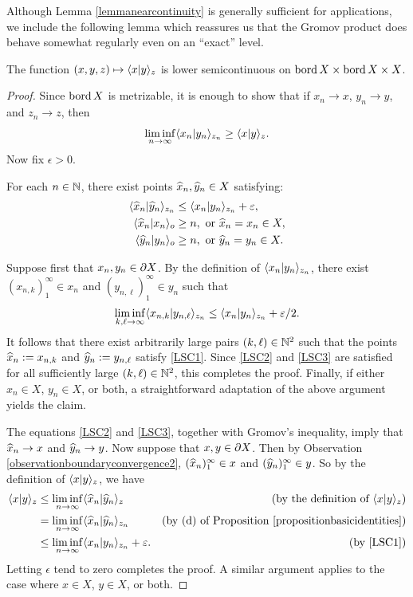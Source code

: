 Although Lemma \ref{lemmanearcontinuity} is generally sufficient for applications, we include the following lemma which reassures us that the Gromov product does behave somewhat regularly even on an ``exact'' level.

\begin{lemma}
\label{lemmalowersemicontinuous}
The function $(x,y,z)\mapsto\langle x|y\rangle_z$ is lower semicontinuous on $\operatorname{bord} X\times\operatorname{bord} X\times X$.
\end{lemma}
\begin{proof}
Since $\operatorname{bord} X$ is metrizable, it is enough to show that if $x_n\to x$, $y_n\to y$, and $z_n\to z$, then
\[
\liminf_{n\to\infty}\langle x_n|y_n\rangle_{z_n} \geq \langle x|y\rangle_z.
\]
Now fix $\epsilon > 0$.
\begin{claim}
For each $n\in\N$, there exist points $\widehat x_n,\widehat y_n\in X$ satisfying:
\begin{align} \label{LSC1}
\langle \widehat x_n|\widehat y_n\rangle_{z_n} &\leq \langle x_n|y_n\rangle_{z_n} + \varepsilon,\\ \label{LSC2}
\langle \widehat x_n|x_n\rangle_o &\geq n, \textup{ or }\widehat x_n = x_n\in X,\\ \label{LSC3}
\langle \widehat y_n|y_n\rangle_o &\geq n, \textup{ or }\widehat y_n = y_n\in X.
\end{align}
\end{claim}
\begin{subproof}
Suppose first that $x_n,y_n\in\partial X$. By the definition of $\langle x_n|y_n\rangle_{z_n}$, there exist $(x_{n,k})_1^\infty\in x_n$ and $(y_{n,\ell})_1^\infty\in y_n$ such that
\[
\liminf_{k,\ell\to\infty} \langle x_{n,k}|y_{n,\ell}\rangle_{z_n} \leq \langle x_n|y_n\rangle_{z_n} + \varepsilon/2.
\]
It follows that there exist arbitrarily large pairs $(k,\ell)\in\N^2$ such that the points $\widehat x_n := x_{n,k}$ and $\widehat y_n := y_{n,\ell}$ satisfy \eqref{LSC1}. Since \eqref{LSC2} and \eqref{LSC3} are satisfied for all sufficiently large $(k,\ell)\in\N^2$, this completes the proof. Finally, if either $x_n\in X$, $y_n\in X$, or both, a straightforward adaptation of the above argument yields the claim.
\end{subproof}
The equations \eqref{LSC2} and \eqref{LSC3}, together with Gromov's inequality, imply that $\widehat x_n\to x$ and $\widehat y_n\to y$. Now suppose that $x,y\in \partial X$. Then by Observation \ref{observationboundaryconvergence2}, $(\widehat x_n)_1^\infty\in x$ and $(\widehat y_n)_1^\infty\in y$. So by the definition of $\langle x|y\rangle_z$, we have
\begin{align*}
\langle x|y\rangle_z &\leq \liminf_{n\to\infty}\langle \widehat x_n|\widehat y_n\rangle_z & \textup{(by the definition of $\langle x|y\rangle_z$)}\\
&= \liminf_{n\to\infty}\langle \widehat x_n|\widehat y_n\rangle_{z_n} & \textup{(by (d) of Proposition \ref{propositionbasicidentities})}\\
&\leq \liminf_{n\to\infty}\langle x_n|y_n\rangle_{z_n} + \varepsilon. & \textup{(by \eqref{LSC1})}
\end{align*}
Letting $\epsilon$ tend to zero completes the proof. A similar argument applies to the case where $x\in X$, $y\in X$, or both.
\end{proof}


